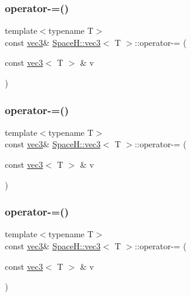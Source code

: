 \subsubsection{\texorpdfstring{operator-\/=()}{operator-=()}\hspace{0.1cm}{\footnotesize\ttfamily [1/7]}}
{\footnotesize\ttfamily template$<$typename T$>$ \\
const \mbox{\hyperlink{struct_space_h_1_1vec3}{vec3}}\& \mbox{\hyperlink{struct_space_h_1_1vec3}{Space\+H\+::vec3}}$<$ T $>$\+::operator-\/= (\begin{DoxyParamCaption}\item[{const \mbox{\hyperlink{struct_space_h_1_1vec3}{vec3}}$<$ T $>$ \&}]{v }\end{DoxyParamCaption})\hspace{0.3cm}{\ttfamily [inline]}}

\mbox{\label{struct_space_h_1_1vec3_a54124bffc816d8dcf912422647bac6c3}} 
\subsubsection{\texorpdfstring{operator-\/=()}{operator-=()}\hspace{0.1cm}{\footnotesize\ttfamily [2/7]}}
{\footnotesize\ttfamily template$<$typename T$>$ \\
const \mbox{\hyperlink{struct_space_h_1_1vec3}{vec3}}\& \mbox{\hyperlink{struct_space_h_1_1vec3}{Space\+H\+::vec3}}$<$ T $>$\+::operator-\/= (\begin{DoxyParamCaption}\item[{const \mbox{\hyperlink{struct_space_h_1_1vec3}{vec3}}$<$ T $>$ \&}]{v }\end{DoxyParamCaption})\hspace{0.3cm}{\ttfamily [inline]}}

\mbox{\label{struct_space_h_1_1vec3_a54124bffc816d8dcf912422647bac6c3}} 
\subsubsection{\texorpdfstring{operator-\/=()}{operator-=()}\hspace{0.1cm}{\footnotesize\ttfamily [3/7]}}
{\footnotesize\ttfamily template$<$typename T$>$ \\
const \mbox{\hyperlink{struct_space_h_1_1vec3}{vec3}}\& \mbox{\hyperlink{struct_space_h_1_1vec3}{Space\+H\+::vec3}}$<$ T $>$\+::operator-\/= (\begin{DoxyParamCaption}\item[{const \mbox{\hyperlink{struct_space_h_1_1vec3}{vec3}}$<$ T $>$ \&}]{v }\end{DoxyParamCaption})\hspace{0.3cm}{\ttfamily [inline]}}

